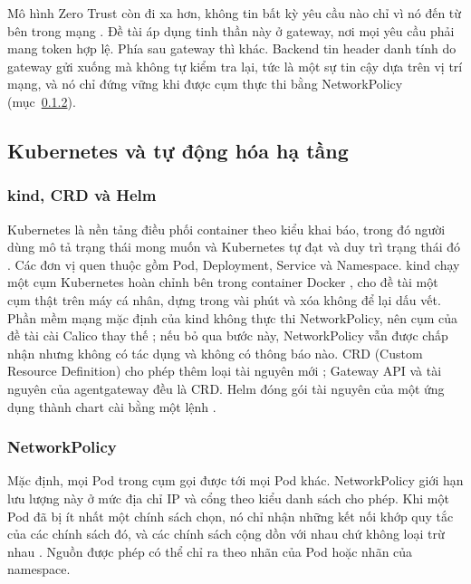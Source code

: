 \documentclass[a4paper]{article}
\begin{document}
Mô hình Zero Trust còn đi xa hơn, không tin bất kỳ yêu cầu nào chỉ vì nó đến từ bên trong mạng \parencite{nist80207}. Đề tài áp dụng tinh thần này ở gateway, nơi mọi yêu cầu phải mang token hợp lệ. Phía sau gateway thì khác. Backend tin header danh tính do gateway gửi xuống mà không tự kiểm tra lại, tức là một sự tin cậy dựa trên vị trí mạng, và nó chỉ đứng vững khi được cụm thực thi bằng NetworkPolicy (mục~\ref{sec:ch3-netpol}).

\subsection{Kubernetes và tự động hóa hạ tầng}

\subsubsection{kind, CRD và Helm}

Kubernetes là nền tảng điều phối container theo kiểu khai báo, trong đó người dùng mô tả trạng thái mong muốn và Kubernetes tự đạt và duy trì trạng thái đó \parencite{k8s_overview}. Các đơn vị quen thuộc gồm Pod, Deployment, Service và Namespace. kind chạy một cụm Kubernetes hoàn chỉnh bên trong container Docker \parencite{kind_docs}, cho đề tài một cụm thật trên máy cá nhân, dựng trong vài phút và xóa không để lại dấu vết. Phần mềm mạng mặc định của kind không thực thi NetworkPolicy, nên cụm của đề tài cài Calico thay thế \parencite{calico_docs}; nếu bỏ qua bước này, NetworkPolicy vẫn được chấp nhận nhưng không có tác dụng và không có thông báo nào. CRD (Custom Resource Definition) cho phép thêm loại tài nguyên mới \parencite{k8s_crd}; Gateway API và tài nguyên của agentgateway đều là CRD. Helm đóng gói tài nguyên của một ứng dụng thành chart cài bằng một lệnh \parencite{helm_docs}.

\subsubsection{NetworkPolicy}\label{sec:ch3-netpol}

Mặc định, mọi Pod trong cụm gọi được tới mọi Pod khác. NetworkPolicy giới hạn lưu lượng này ở mức địa chỉ IP và cổng theo kiểu danh sách cho phép. Khi một Pod đã bị ít nhất một chính sách chọn, nó chỉ nhận những kết nối khớp quy tắc của các chính sách đó, và các chính sách cộng dồn với nhau chứ không loại trừ nhau \parencite{k8s_netpol}. Nguồn được phép có thể chỉ ra theo nhãn của Pod hoặc nhãn của namespace.
\end{document}

